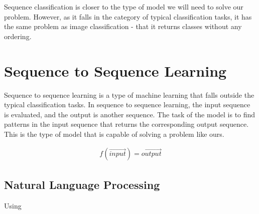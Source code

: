 Sequence classification is closer to the type of model we will need to solve our problem. However, as it falls in the category of typical classification tasks, it has the same problem as image classification - that it returns classes without any ordering.


\section{Sequence to Sequence Learning}
Sequence to sequence learning is a type of machine learning that falls outside the typical classification tasks. In sequence to sequence learning, the input sequence is evaluated, and the output is another sequence. The task of the model is to find patterns in the input sequence that returns the corresponding output sequence. This is the type of model that is capable of solving a problem like ours.

\begin{equation}
    \begin{aligned}
        f(\vec{input}) = \vec{output}
    \end{aligned}
\end{equation}

\subsection{Natural Language Processing}
Using 

